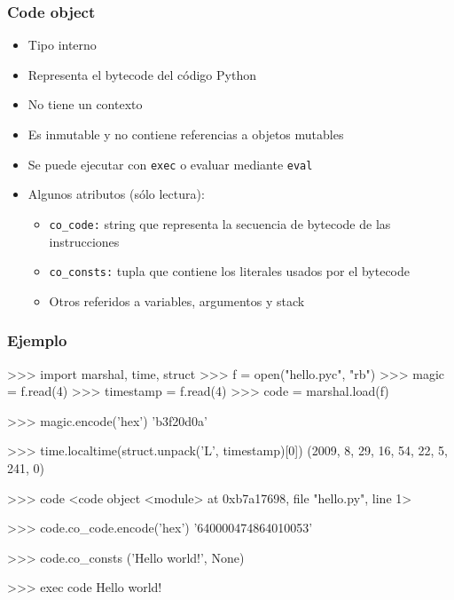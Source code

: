 \documentclass[9pt, notes=hide]{beamer}
\begin{document}
    \begin{frame}
        \frametitle{Code object}

        \begin{itemize}
            \item Tipo interno
            \item Representa el bytecode del código Python
            \item No tiene un contexto
            \item Es inmutable y no contiene referencias a objetos mutables
            \item Se puede ejecutar con \texttt{exec} o evaluar mediante \texttt{eval}
            \item Algunos atributos (sólo lectura):
                \begin{itemize}
                    \item \texttt{co\_code:} string que representa la secuencia de bytecode de las instrucciones
                    \item \texttt{co\_consts:} tupla que contiene los literales usados por el bytecode
                    \item Otros referidos a variables, argumentos y stack
                \end{itemize}
        \end{itemize}
    \end{frame}

\begin{frame}[fragile]
    \frametitle{Ejemplo}

\begin{python}
>>> import marshal, time, struct
>>> f = open("hello.pyc", "rb")
>>> magic = f.read(4)
>>> timestamp = f.read(4)
>>> code = marshal.load(f)

>>> magic.encode('hex')
'b3f20d0a'

>>> time.localtime(struct.unpack('L', timestamp)[0])
(2009, 8, 29, 16, 54, 22, 5, 241, 0)

>>> code
<code object <module> at 0xb7a17698, file "hello.py", line 1>

>>> code.co_code.encode('hex')
'640000474864010053'

>>> code.co_consts
('Hello world!', None)

>>> exec code
Hello world!

\end{python}

\end{frame}
\end{document}
